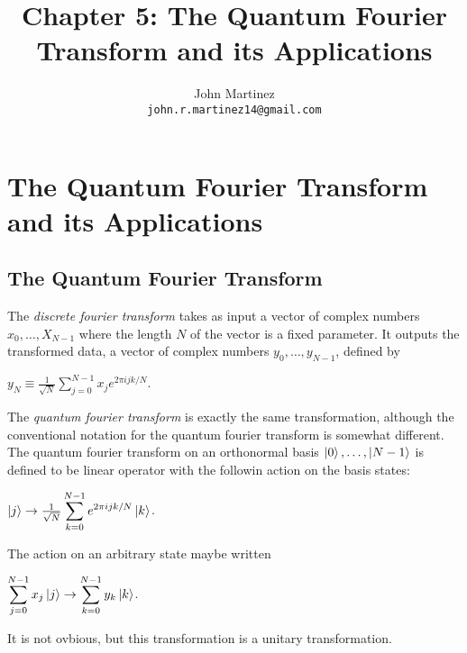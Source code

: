 \documentclass{article}
\title{Chapter 5: The Quantum Fourier Transform and its Applications}
\author{
  John Martinez \\
  \texttt{john.r.martinez14@gmail.com} \\
}
\begin{document}
\maketitle

\section{The Quantum Fourier Transform and its Applications}

\subsection{The Quantum Fourier Transform}
The \emph{discrete fourier transform} takes as input a vector of complex numbers
$x_0,\dots,X_{N-1}$ where the length $N$ of the vector is a fixed parameter. It
outputs the transformed data, a vector of complex numbers $y_{0},\dots,y_{N-1}$,
defined by
\begin{center}
  $y_{N} \equiv \frac{1}{\sqrt{N}}\displaystyle\sum_{j=0}^{N-1} x_{j}e^{2\pi i j k/N}$.
\end{center}

The \emph{quantum fourier transform} is exactly the same transformation,
although the conventional notation for the quantum fourier transform is
somewhat different. The quantum fourier transform on an orthonormal basis
$\ket{0},\dots,\ket{N-1}$ is defined to be linear operator with the followin
action on the basis states:
\begin{center}
  $\ket{j} \rightarrow
  \frac{1}{\sqrt{N}}\displaystyle\sum_{k=0}^{N-1}e^{2\pi i j k /N}\ket{k}$.
\end{center}

The action on an arbitrary state maybe written
\begin{center}
  $\displaystyle\sum_{j=0}^{N-1}x_j\ket{j} \rightarrow
  \displaystyle\sum_{k=0}^{N-1}y_k\ket{k}$.
\end{center}

It is not ovbious, but this transformation is a unitary transformation.
\end{document}

